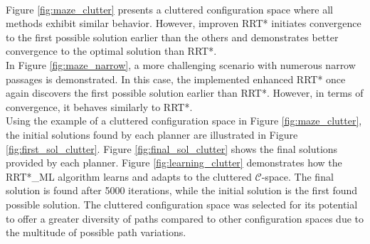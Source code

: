 \documentclass{ctuthesis}
\begin{document}
\\
Figure \ref{fig:maze_clutter} presents a cluttered configuration space where all methods exhibit similar behavior. 
However, improven RRT* initiates convergence to the first possible solution earlier than the others and 
demonstrates better convergence to the optimal solution than RRT*.
\\[12pt]
In Figure \ref{fig:maze_narrow}, 
a more challenging scenario with numerous narrow passages is demonstrated. 
In this case, 
the implemented enhanced RRT* once again discovers the first possible solution earlier than RRT*. 
However, in terms of convergence, it behaves similarly to RRT*.
\\[12pt]
Using the example of a cluttered configuration space in Figure \ref{fig:maze_clutter}, 
the initial solutions found by each planner are illustrated in Figure \ref{fig:first_sol_clutter}. 
Figure \ref{fig:final_sol_clutter} shows the final solutions provided by each planner. 
Figure \ref{fig:learning_clutter} demonstrates how 
the RRT*\_ML algorithm learns and adapts to the cluttered $\mathcal{C}$-space. 
The final solution is found after 5000 iterations, 
while the initial solution is the first found possible solution.
The cluttered configuration space was selected for its potential to offer a greater diversity 
of paths compared to other configuration spaces due to the multitude of possible path variations.
\end{document}
